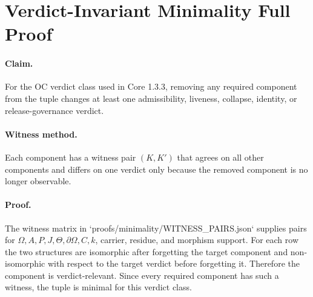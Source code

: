 
\section{Verdict-Invariant Minimality Full Proof}
\label{app:oc133-minimality}

\paragraph{Claim.}
For the OC verdict class used in Core 1.3.3, removing any required component
from the tuple changes at least one admissibility, liveness, collapse,
identity, or release-governance verdict.

\paragraph{Witness method.}
Each component has a witness pair \((K,K')\) that agrees on all other
components and differs on one verdict only because the removed component is no
longer observable.

\paragraph{Proof.}
The witness matrix in `proofs/minimality/WITNESS_PAIRS.json` supplies pairs for
\(\Omega,A,P,J,\Theta,\partial\Omega,C,k\), carrier, residue, and morphism
support.  For each row the two structures are isomorphic after forgetting the
target component and non-isomorphic with respect to the target verdict before
forgetting it.  Therefore the component is verdict-relevant.  Since every
required component has such a witness, the tuple is minimal for this verdict
class.
